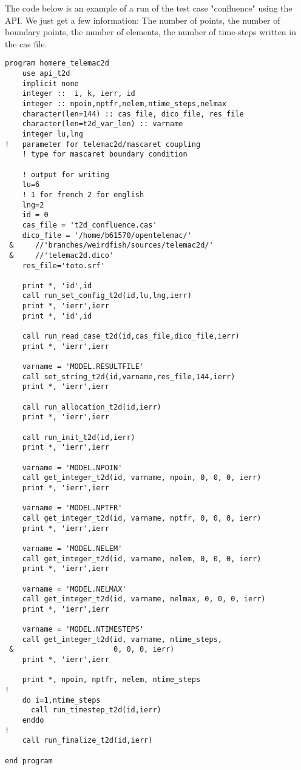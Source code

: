 The code below is an example of a run of the test case "confluence" using the
API. We just get a few information: The number of points, the number of
boundary points, the number of elements, the number of time-steps written in the
cas file.
\begin{lstlisting}
program homere_telemac2d
    use api_t2d
    implicit none
    integer ::  i, k, ierr, id
    integer :: npoin,nptfr,nelem,ntime_steps,nelmax
    character(len=144) :: cas_file, dico_file, res_file
    character(len=t2d_var_len) :: varname
    integer lu,lng
!   parameter for telemac2d/mascaret coupling
    ! type for mascaret boundary condition
   
    ! output for writing
    lu=6
    ! 1 for french 2 for english
    lng=2
    id = 0
    cas_file = 't2d_confluence.cas'
    dico_file = '/home/b61570/opentelemac/'
 &     //'branches/weirdfish/sources/telemac2d/'
 &     //'telemac2d.dico'
    res_file='toto.srf'

    print *, 'id',id
    call run_set_config_t2d(id,lu,lng,ierr)
    print *, 'ierr',ierr
    print *, 'id',id

    call run_read_case_t2d(id,cas_file,dico_file,ierr)
    print *, 'ierr',ierr

    varname = 'MODEL.RESULTFILE'
    call set_string_t2d(id,varname,res_file,144,ierr)
    print *, 'ierr',ierr
    
    call run_allocation_t2d(id,ierr)
    print *, 'ierr',ierr
 
    call run_init_t2d(id,ierr)
    print *, 'ierr',ierr

    varname = 'MODEL.NPOIN'
    call get_integer_t2d(id, varname, npoin, 0, 0, 0, ierr)
    print *, 'ierr',ierr

    varname = 'MODEL.NPTFR'
    call get_integer_t2d(id, varname, nptfr, 0, 0, 0, ierr)
    print *, 'ierr',ierr

    varname = 'MODEL.NELEM'
    call get_integer_t2d(id, varname, nelem, 0, 0, 0, ierr)
    print *, 'ierr',ierr

    varname = 'MODEL.NELMAX'
    call get_integer_t2d(id, varname, nelmax, 0, 0, 0, ierr)
    print *, 'ierr',ierr

    varname = 'MODEL.NTIMESTEPS'
    call get_integer_t2d(id, varname, ntime_steps, 
 &                       0, 0, 0, ierr)
    print *, 'ierr',ierr

    print *, npoin, nptfr, nelem, ntime_steps
!
    do i=1,ntime_steps
      call run_timestep_t2d(id,ierr)
    enddo
!
    call run_finalize_t2d(id,ierr)

end program
\end{lstlisting}

